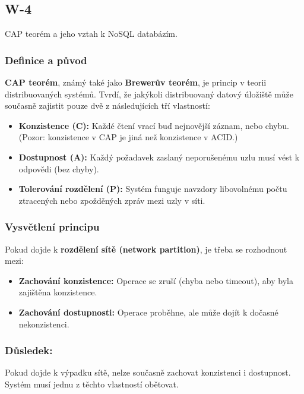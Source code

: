 \subsection {W-4}
CAP teorém a jeho vztah k NoSQL databázím.

\subsubsection*{Definice a původ}

\textbf{CAP teorém}, známý také jako \textbf{Brewerův teorém}, je princip v teorii distribuovaných systémů. Tvrdí, že jakýkoli distribuovaný datový úložiště může současně zajistit pouze dvě z následujících tří vlastností:

\begin{itemize}
    \item \textbf{Konzistence (C):} Každé čtení vrací buď nejnovější záznam, nebo chybu. (Pozor: konzistence v CAP je jiná než konzistence v ACID.)
    \item \textbf{Dostupnost (A):} Každý požadavek zaslaný neporušenému uzlu musí vést k odpovědi (bez chyby).
    \item \textbf{Tolerování rozdělení (P):} Systém funguje navzdory libovolnému počtu ztracených nebo zpožděných zpráv mezi uzly v síti.
\end{itemize}

\subsubsection*{Vysvětlení principu}

Pokud dojde k \textbf{rozdělení sítě (network partition)}, je třeba se rozhodnout mezi:

\begin{itemize}
    \item \textbf{Zachování konzistence:} Operace se zruší (chyba nebo timeout), aby byla zajištěna konzistence.
    \item \textbf{Zachování dostupnosti:} Operace proběhne, ale může dojít k dočasné nekonzistenci.
\end{itemize}

\subsubsection*{Důsledek:}

Pokud dojde k výpadku sítě, nelze současně zachovat konzistenci i dostupnost. Systém musí jednu z těchto vlastností obětovat.

